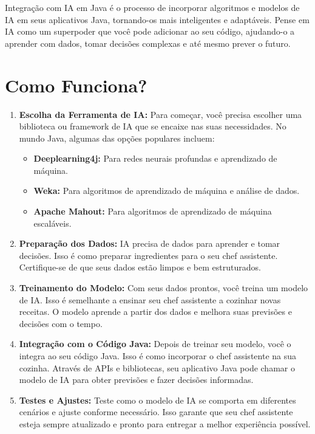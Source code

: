 \documentclass[a4paper,12pt]{book}
\begin{document}
Integração com IA em Java é o processo de incorporar algoritmos e modelos de IA em seus aplicativos Java, tornando-os mais inteligentes e adaptáveis. Pense em IA como um superpoder que você pode adicionar ao seu código, ajudando-o a aprender com dados, tomar decisões complexas e até mesmo prever o futuro.

\section*{Como Funciona?}

\begin{enumerate}
    \item \textbf{Escolha da Ferramenta de IA:} Para começar, você precisa escolher uma biblioteca ou framework de IA que se encaixe nas suas necessidades. No mundo Java, algumas das opções populares incluem:
    \begin{itemize}
        \item \textbf{Deeplearning4j:} Para redes neurais profundas e aprendizado de máquina.
        \item \textbf{Weka:} Para algoritmos de aprendizado de máquina e análise de dados.
        \item \textbf{Apache Mahout:} Para algoritmos de aprendizado de máquina escaláveis.
    \end{itemize}

    \item \textbf{Preparação dos Dados:} IA precisa de dados para aprender e tomar decisões. Isso é como preparar ingredientes para o seu chef assistente. Certifique-se de que seus dados estão limpos e bem estruturados.

    \item \textbf{Treinamento do Modelo:} Com seus dados prontos, você treina um modelo de IA. Isso é semelhante a ensinar seu chef assistente a cozinhar novas receitas. O modelo aprende a partir dos dados e melhora suas previsões e decisões com o tempo.

    \item \textbf{Integração com o Código Java:} Depois de treinar seu modelo, você o integra ao seu código Java. Isso é como incorporar o chef assistente na sua cozinha. Através de APIs e bibliotecas, seu aplicativo Java pode chamar o modelo de IA para obter previsões e fazer decisões informadas.

    \item \textbf{Testes e Ajustes:} Teste como o modelo de IA se comporta em diferentes cenários e ajuste conforme necessário. Isso garante que seu chef assistente esteja sempre atualizado e pronto para entregar a melhor experiência possível.
\end{enumerate}
\end{document}
